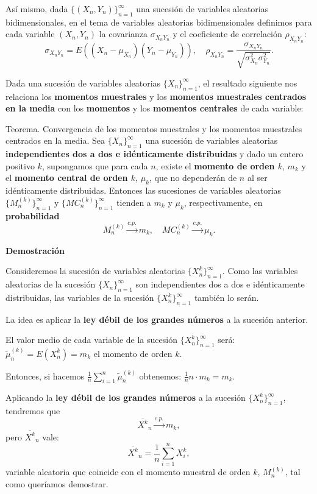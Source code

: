 \documentclass[
  letterpaper,
  DIV=11,
  numbers=noendperiod]{scrreprt}
\begin{document}
Así mismo, dada \(\{(X_n,Y_n)\}_{n=1}^\infty\) una sucesión de variables
aleatorias bidimensionales, en el tema de variables aleatorias
bidimensionales definimos para cada variable \((X_n,Y_n)\) la covarianza
\(\sigma_{X_nY_n}\) y el coeficiente de correlación \(\rho_{X_nY_n}\):
\[
\sigma_{X_nY_n}=E((X_n-\mu_{X_n})(Y_n-\mu_{Y_n})),\quad \rho_{X_nY_n}=\frac{\sigma_{X_nY_n}}{\sqrt{\sigma_{X_n}^2\sigma_{Y_n}^2}}.
\]

Dada una sucesión de variables aleatorias \(\{X_n\}_{n=1}^\infty\), el
resultado siguiente nos relaciona los \textbf{momentos muestrales} y los
\textbf{momentos muestrales centrados en la media} con los
\textbf{momentos} y los \textbf{momentos centrales} de cada variable:

Teorema. Convergencia de los momentos muestrales y los momentos
muestrales centrados en la media. Sea \(\{X_n\}_{n=1}^\infty\) una
sucesión de variables aleatorias \textbf{independientes dos a dos e
idénticamente distribuidas} y dado un entero positivo \(k\), supongamos
que para cada \(n\), existe el \textbf{momento de orden \(k\)}, \(m_k\)
y el \textbf{momento central de orden \(k\)}, \(\mu_k\), que no
dependerán de \(n\) al ser idénticamente distribuidas. Entonces las
sucesiones de variables aleatorias \(\{M_n^{(k)}\}_{n=1}^\infty\) y
\(\{MC_n^{(k)}\}_{n=1}^\infty\) tienden a \(m_k\) y \(\mu_k\),
respectivamente, en \textbf{probabilidad} \[
M_n^{(k)}\stackrel{c.p.}{\longrightarrow} m_k,\quad MC_n^{(k)}\stackrel{c.p.}{\longrightarrow} \mu_k.
\]

\textbf{Demostración}

Consideremos la sucesión de variables aleatorias
\(\{X_n^k\}_{n=1}^\infty\). Como las variables aleatorias de la sucesión
\(\{X_n\}_{n=1}^\infty\) son independientes dos a dos e idénticamente
distribuidas, las variables de la sucesión \(\{X_n^k\}_{n=1}^\infty\)
también lo serán.

La idea es aplicar la \textbf{ley débil de los grandes números} a la
sucesión anterior.

El valor medio de cada variable de la sucesión
\(\{X_n^k\}_{n=1}^\infty\) será: \(\tilde{\mu}_n^{(k)}= E(X_n^{k})=m_k\)
el momento de orden \(k\).

Entonces, si hacemos
\(\frac{1}{n}\sum\limits_{i=1}^n \tilde{\mu}_n^{(k)}\) obtenemos:
\(\frac{1}{n} n\cdot m_k=m_k.\)

Aplicando la \textbf{ley débil de los grandes números} a la sucesión
\(\{X_n^k\}_{n=1}^\infty\), tendremos que \[
\overline{X^k}_n \stackrel{c.p.}{\longrightarrow}m_k,
\] pero \(\overline{X^k}_n\) vale: \[
\overline{X^k}_n=\frac{1}{n}\sum_{i=1}^n X_i^k,
\] variable aleatoria que coincide con el momento muestral de orden
\(k\), \(M_n^{(k)}\), tal como queríamos demostrar.
\end{document}
